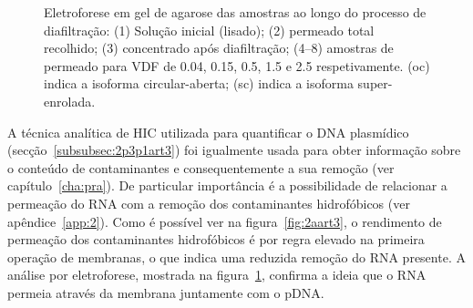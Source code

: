 \begin{figure}%
\centering
{}
\caption[Eletroforese em gel de agarose ao longo do processo de diafiltração]{Eletroforese em gel de agarose das amostras ao longo do processo de diafiltração: (1) Solução inicial (lisado); (2) permeado total recolhido; (3) concentrado após diafiltração; (4--8) amostras de permeado para VDF de 0.04, 0.15, 0.5, 1.5 e 2.5 respetivamente. (oc) indica a isoforma circular-aberta; (sc) indica a isoforma super-enrolada.}
\label{fig:2bart3}
\end{figure}
A técnica analítica de HIC utilizada para quantificar o DNA plasmídico (secção~\ref{subsubsec:2p3p1art3}) foi igualmente usada para obter informação sobre o conteúdo de contaminantes e consequentemente a sua remoção (ver capítulo~\ref{cha:pra}). De particular importância é a possibilidade de relacionar a permeação do RNA com a remoção dos contaminantes hidrofóbicos (ver apêndice~\ref{app:2}).
%
%
%
%
Como é possível ver na figura~\ref{fig:2aart3}, o rendimento de permeação dos contaminantes hidrofóbicos é por regra elevado na primeira operação de membranas, o que indica uma reduzida remoção do RNA presente. A análise por eletroforese, mostrada na figura~\ref{fig:2bart3}, confirma a ideia que o RNA permeia através da membrana juntamente com o pDNA. 

